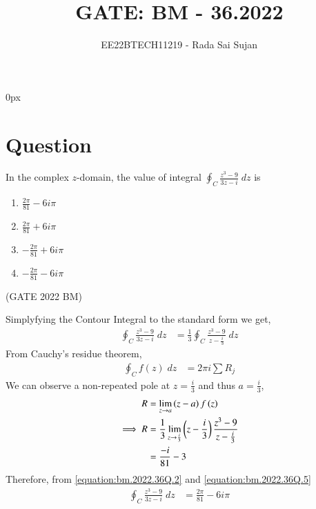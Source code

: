 \documentclass[journal,12pt,twocolumn]{IEEEtran}
\theoremstyle{remark}
\begin{document}
\parindent 0px

\title{GATE: BM - 36.2022}
\author{EE22BTECH11219 - Rada Sai Sujan$^{}$%
}
\maketitle
\newpage
\bigskip
\section*{Question}
In the complex $z$-domain, the value of integral $\oint_{C}\frac{z^3-9}{3z-i}\;dz$ is   \\
\begin{enumerate}[label=(\alph*)]
    \item $\frac{2\pi}{81}-6i\pi$ 
    \item $\frac{2\pi}{81}+6i\pi$ 
    \item $-\frac{2\pi}{81}+6i\pi$ 
    \item $-\frac{2\pi}{81}-6i\pi$ 
\end{enumerate} \hfill(GATE 2022 BM)    \\
\solution

Simplyfying the Contour Integral to the standard form we get,
\begin{align}
    \oint_{C}\frac{z^3-9}{3z-i}\;dz &= \frac{1}{3}\oint_{C}\frac{z^3-9}{z-\frac{i}{3}}\;dz
\end{align}
From Cauchy's residue theorem,
\begin{align}
    \oint_{C}f(z)\;dz &= 2\pi i\sum R_j \label{equation:bm.2022.36Q.2}
\end{align}
We can observe a non-repeated pole at $z=\frac{i}{3}$ and thus $a=\frac{i}{3}$,
\begin{align}
    R &= \lim\limits_{z\to a}\left(z-a\right)f\left(z\right)    \\
    \implies R &= \frac{1}{3}\lim\limits_{z\to \frac{i}{3}}\left(z-\frac{i}{3}\right)\frac{z^3-9}{z-\frac{i}{3}}  \\
    &= \frac{-i}{81}-3  \label{equation:bm.2022.36Q.5}
\end{align}
Therefore, from \eqref{equation:bm.2022.36Q.2} and \eqref{equation:bm.2022.36Q.5}
\begin{align}
    \oint_{C}\frac{z^3-9}{3z-i}\;dz &= \frac{2\pi}{81}-6i\pi
\end{align}
\end{document}
